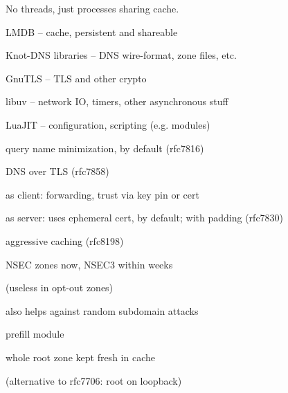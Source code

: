 \slide[Architecture]
No threads, just processes sharing cache.

\bulletList
\item LMDB -- cache, persistent and shareable
\item Knot-DNS libraries -- DNS wire-format, zone files, etc.
\item GnuTLS -- TLS and other crypto
\item libuv -- network IO, timers, other asynchronous stuff
\item LuaJIT -- configuration, scripting (e.g. modules)
\endBulletList



\bulletList

\item query name minimization, by default (rfc7816)

\item DNS over TLS (rfc7858)
	\dashList
	\item as client: forwarding, trust via key pin or cert

	\item as server: uses ephemeral cert, by default;
		with padding (rfc7830)
	\endDashList

\endBulletList
{}
\bulletList

\item aggressive caching (rfc8198)
	\dashList
	\item NSEC zones now, NSEC3 within weeks
	\par (useless in opt-out zones)
	\item also helps against random subdomain attacks
	\endDashList

\item prefill module
	\dashList
	\item whole root zone kept fresh in cache
	\par (alternative to rfc7706: root on loopback)
	\endDashList

